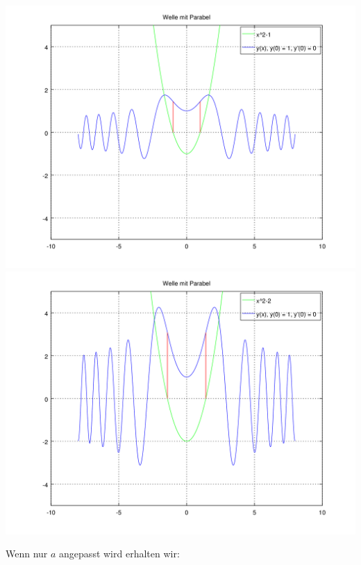 \noindent
\includegraphics[scale=0.35]{./wellen/images/varc/cneg1.png}
\includegraphics[scale=0.35]{./wellen/images/varc/cneg2.png}

Wenn nur $a$ angepasst wird erhalten wir:

